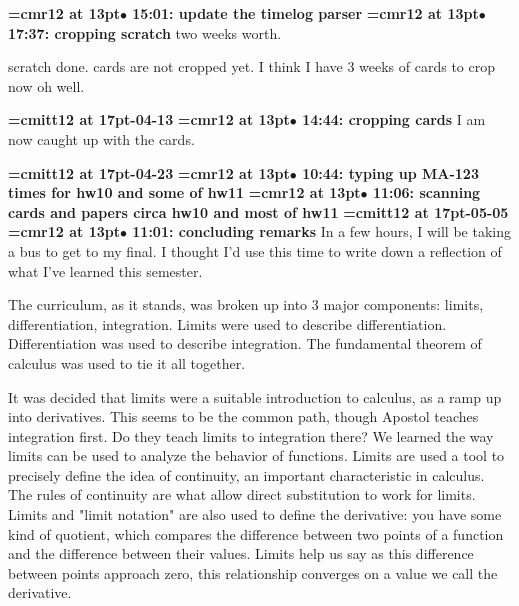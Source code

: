 {\smallskip\noindent\bf\font\titlefont=cmr12 at 13pt\titlefont $\bullet$ 15:01: update the timelog parser}\smallskip
{\smallskip\noindent\bf\font\titlefont=cmr12 at 13pt\titlefont $\bullet$ 17:37: cropping scratch}\smallskip
two weeks worth.
\par

scratch done. cards are not cropped yet. I think I have 3 weeks of cards to crop now oh well.
\par

{\medskip\noindent\bf\font\titlefont=cmitt12 at 17pt-04-13}\medskip
{\smallskip\noindent\bf\font\titlefont=cmr12 at 13pt\titlefont $\bullet$ 14:44: cropping cards}\smallskip
I am now caught up with the cards.
\par

{\medskip\noindent\bf\font\titlefont=cmitt12 at 17pt-04-23}\medskip
{\smallskip\noindent\bf\font\titlefont=cmr12 at 13pt\titlefont $\bullet$ 10:44: typing up MA-123 times for hw10 and some of hw11}\smallskip
{\smallskip\noindent\bf\font\titlefont=cmr12 at 13pt\titlefont $\bullet$ 11:06: scanning cards and papers circa hw10 and most of hw11}\smallskip
{\medskip\noindent\bf\font\titlefont=cmitt12 at 17pt-05-05}\medskip
{\smallskip\noindent\bf\font\titlefont=cmr12 at 13pt\titlefont $\bullet$ 11:01: concluding remarks}\smallskip
In a few hours, I will be taking a bus to get to my final. I thought I'd use this time to write down a reflection of what I've learned this semester.
\par

The curriculum, as it stands, was broken up into 3 major components: limits, differentiation, integration. Limits were used to describe differentiation. Differentiation was used to describe integration. The fundamental theorem of calculus was used to tie it all together.
\par

It was decided that limits were a suitable introduction to calculus, as a ramp up into derivatives. This seems to be the common path, though Apostol teaches integration first. Do they teach limits to integration there? We learned the way limits can be used to analyze the behavior of functions. Limits are used a tool to precisely define the idea of continuity, an important characteristic in calculus. The rules of continuity are what allow direct substitution to work for limits. Limits and "limit notation" are also used to define the derivative: you have some kind of quotient, which compares the difference between two points of a function and the difference between their values. Limits help us say as this difference between points approach zero, this relationship converges on a value we call the derivative.
\par

